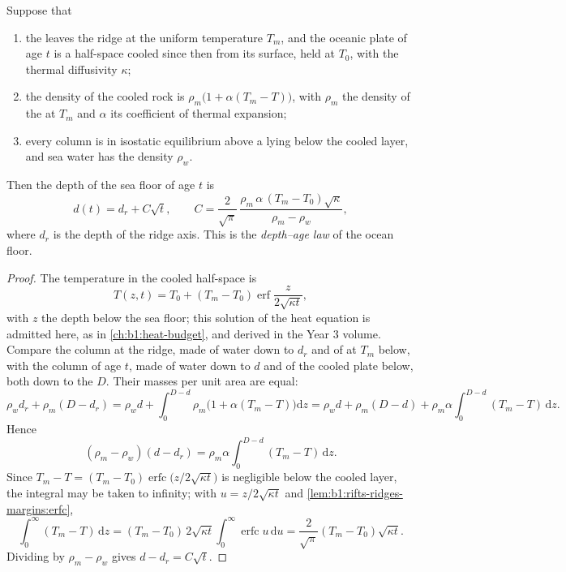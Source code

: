 \begin{theorem}\label{thm:b1:rifts-ridges-margins:depth-age}
Suppose that
\begin{enumerate}
  \item the  leaves the ridge at the uniform temperature $T_m$, and the
        oceanic plate of age $t$ is a half-space cooled since then from its
        surface, held at $T_0$, with the thermal diffusivity $\kappa$;
  \item the density of the cooled rock is $\rho_m\bigl(1 + \alpha(T_m -
        T)\bigr)$, with $\rho_m$ the density of the  at $T_m$ and
        $\alpha$ its coefficient of thermal expansion;
  \item every column is in isostatic equilibrium above a 
        lying below the cooled layer, and sea water has the density $\rho_w$.
\end{enumerate}
Then the depth of the sea floor of age $t$ is
\[
  d(t) = d_r + C\sqrt t, \qquad
  C = \frac{2}{\sqrt\pi}\,\frac{\rho_m\,\alpha\,(T_m - T_0)\sqrt\kappa}{\rho_m - \rho_w},
\]
where $d_r$ is the depth of the ridge axis. This is the
\emph{depth--age law} of the ocean floor.
\end{theorem}

\begin{proof}
The temperature in the cooled half-space is
\[
  T(z, t) = T_0 + (T_m - T_0)\operatorname{erf}\frac{z}{2\sqrt{\kappa t}},
\]
with $z$ the depth below the sea floor; this solution of the heat equation is
admitted here, as in \cref{ch:b1:heat-budget}, and derived in the Year 3
volume. Compare the column at the ridge, made of water down to $d_r$ and of
 at $T_m$ below, with the column of age $t$, made of water down to $d$ and
of the cooled plate below, both down to the  $D$. Their masses
per unit area are equal:
\[
  \rho_w d_r + \rho_m (D - d_r) = \rho_w d + \int_0^{D-d}\rho_m\bigl(1 + \alpha(T_m - T)\bigr)\mathrm dz
  = \rho_w d + \rho_m (D - d) + \rho_m\alpha\int_0^{D-d}(T_m - T)\,\mathrm dz.
\]
Hence
\[
  (\rho_m - \rho_w)(d - d_r) = \rho_m\alpha\int_0^{D-d}(T_m - T)\,\mathrm dz.
\]
Since $T_m - T = (T_m - T_0)\operatorname{erfc}\bigl(z/2\sqrt{\kappa t}\bigr)$ is
negligible below the cooled layer, the integral may be taken to infinity; with
$u = z/2\sqrt{\kappa t}$ and \cref{lem:b1:rifts-ridges-margins:erfc},
\[
  \int_0^\infty (T_m - T)\,\mathrm dz = (T_m - T_0)\,2\sqrt{\kappa t}\int_0^\infty\operatorname{erfc}u\,\mathrm du
  = \frac{2}{\sqrt\pi}(T_m - T_0)\sqrt{\kappa t}.
\]
Dividing by $\rho_m - \rho_w$ gives $d - d_r = C\sqrt t$.
\end{proof}

